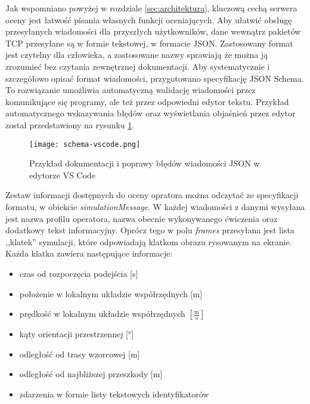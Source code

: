 Jak wspomniano powyżej w rozdziale \ref{sec:architektura}, kluczową cechą serwera oceny jest łatwość pisania własnych funkcji oceniających. Aby ułatwić obsługę przesyłanych wiadomości dla przyszłych użytkowników, dane wewnątrz pakietów TCP przesyłane są w formie tekstowej, w formacie JSON. Zastosowany format jest czytelny dla człowieka, a zastosowane nazwy sprawiają że można ją zrozumieć bez czytania zewnętrznej dokumentacji. Aby systematycznie i szczegółowo opisać format wiadomości, przygotowano specyfikację JSON Schema\cite{jsonschema2020}. To rozwiązanie umożliwia automatyczną walidację wiadomości przez komunikujące się programy, ale też przez odpowiedni edytor tekstu. Przykład automatycznego wskazywania błędów oraz wyświetlania objaśnień przez edytor został przedstawiony na rysunku \ref{fig:schema-vscode}.

\begin{figure}[!h]
    \caption{Przykład dokumentacji i poprawy błędów wiadomości JSON w edytorze VS Code}
    \label{fig:schema-vscode}
    \centering \texttt{[image: schema-vscode.png]}
\end{figure}

Zestaw informacji dostępnych do oceny opratora można odczytać ze specyfikacji formatu, w obiekcie \emph{simulationMessage}. W każdej wiadomości z danymi wysyłana jest nazwa profilu operatora, nazwa obecnie wykonywanego ćwiczenia oraz dodatkowy tekst informacyjny. Oprócz tego w polu \emph{frames} przesyłana jest lista ,,klatek'' symulacji, które odpowiadają klatkom obrazu rysowanym na ekranie. Każda klatka zawiera następujące informacje:

\begin{itemize}
    \item czas od rozpoczęcia podejścia [s]
    \item położenie w lokalnym układzie współrzędnych [m]
    \item prędkość w lokalnym układzie współrzędnych $ \left[ \frac{\text{m}}{\text{s}} \right] $
    \item kąty orientacji przestrzennej [°]
    \item odległość od trasy wzorcowej [m]
    \item odległość od najbliższej przeszkody [m]
    \item zdarzenia w formie listy tekstowych identyfikatorów
\end{itemize}

